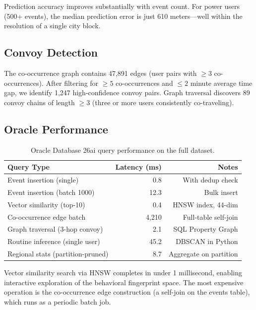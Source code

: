 \documentclass[11pt,a4paper]{article}
\begin{document}
Prediction accuracy improves substantially with event count. For power users (500+ events), the median prediction error is just 610 meters---well within the resolution of a single city block.

\subsection{Convoy Detection}
\label{sec:exp_convoy}

The co-occurrence graph contains 47,891 edges (user pairs with $\geq 3$ co-occurrences). After filtering for $\geq 5$ co-occurrences and $\leq 2$ minute average time gap, we identify 1,247 high-confidence convoy pairs. Graph traversal discovers 89 convoy chains of length $\geq 3$ (three or more users consistently co-traveling).

\subsection{Oracle Performance}

\begin{table}[ht]
\centering
\caption{Oracle Database 26ai query performance on the full dataset.}
\label{tab:oracle_perf}
\begin{tabular}{lrr}
\toprule
\textbf{Query Type} & \textbf{Latency (ms)} & \textbf{Notes} \\
\midrule
Event insertion (single)         &   0.8 & With dedup check \\
Event insertion (batch 1000)     &  12.3 & Bulk insert \\
Vector similarity (top-10)       &   0.4 & HNSW index, 44-dim \\
Co-occurrence edge batch         & 4,210 & Full-table self-join \\
Graph traversal (3-hop convoy)   &   2.1 & SQL Property Graph \\
Routine inference (single user)  &  45.2 & DBSCAN in Python \\
Regional stats (partition-pruned) &  8.7 & Aggregate on partition \\
\bottomrule
\end{tabular}
\end{table}

Vector similarity search via HNSW completes in under 1 millisecond, enabling interactive exploration of the behavioral fingerprint space. The most expensive operation is the co-occurrence edge construction (a self-join on the events table), which runs as a periodic batch job.
\end{document}
